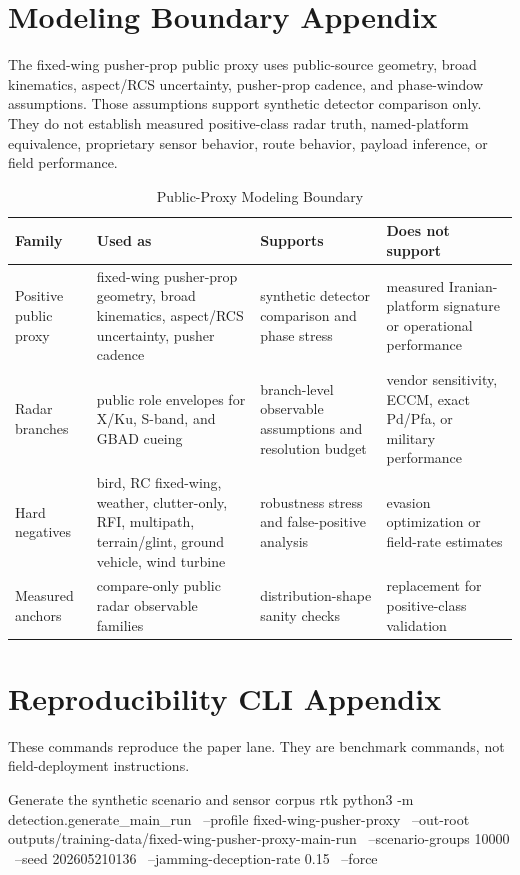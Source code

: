 \documentclass[10pt,journal]{IEEEtran}
\begin{document}
\clearpage
\onecolumn
\appendices

\section{Modeling Boundary Appendix}
The fixed-wing pusher-prop public proxy uses public-source geometry, broad kinematics, aspect/RCS uncertainty, pusher-prop cadence, and phase-window assumptions. Those assumptions support synthetic detector comparison only. They do not establish measured positive-class radar truth, named-platform equivalence, proprietary sensor behavior, route behavior, payload inference, or field performance.

\begin{table}[t]
  \caption{Public-Proxy Modeling Boundary}
  \label{tab:modelboundary}
  \centering
  \small
  \begin{tabularx}{\textwidth}{@{}p{}YYp{0.25\textwidth}@{}}
    \toprule
    Family & Used as & Supports & Does not support \\
    \midrule
    Positive public proxy & fixed-wing pusher-prop geometry, broad kinematics, aspect/RCS uncertainty, pusher cadence & synthetic detector comparison and phase stress & measured Iranian-platform signature or operational performance \\
    Radar branches & public role envelopes for X/Ku, S-band, and GBAD cueing & branch-level observable assumptions and resolution budget & vendor sensitivity, ECCM, exact Pd/Pfa, or military performance \\
    Hard negatives & bird, RC fixed-wing, weather, clutter-only, RFI, multipath, terrain/glint, ground vehicle, wind turbine & robustness stress and false-positive analysis & evasion optimization or field-rate estimates \\
    Measured anchors & compare-only public radar observable families & distribution-shape sanity checks & replacement for positive-class validation \\
    \bottomrule
  \end{tabularx}
\end{table}

\section{Reproducibility CLI Appendix}
These commands reproduce the paper lane. They are benchmark commands, not field-deployment instructions.

\begin{EchoCodeBox}{Generate the synthetic scenario and sensor corpus}
rtk python3 -m detection.generate_main_run \
  --profile fixed-wing-pusher-proxy \
  --out-root outputs/training-data/fixed-wing-pusher-proxy-main-run \
  --scenario-groups 10000 \
  --seed 202605210136 \
  --jamming-deception-rate 0.15 \
  --force
\end{EchoCodeBox}
\end{document}
